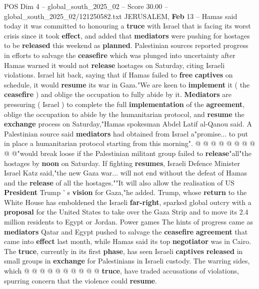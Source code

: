 \begin{textsample}{POS Dim 4 – global\_south\_2025\_02 – Score 30.00 – global\_south\_2025\_02/121250582.txt}  \label{ex:f4_pos_029}
JERUSALEM, \textbf{Feb} 13 -- Hamas said today it was committed to honouring a \textbf{truce} with Israel that is facing its worst crisis since it took \textbf{effect}, and added that \textbf{mediators} were pushing for hostages to be \textbf{released} this weekend as \textbf{planned}.
Palestinian sources reported progress in efforts to salvage the \textbf{ceasefire} which was plunged into uncertainty after Hamas warned it would not \textbf{release} hostages on Saturday, citing Israeli violations.
Israel hit back, saying that if Hamas failed to \textbf{free} \textbf{captives} on schedule, it would \textbf{resume} its war in Gaza."We are keen to \textbf{implement} it ( the \textbf{ceasefire} ) and oblige the occupation to fully abide by it. \textbf{Mediators} are pressuring ( Israel ) to complete the full \textbf{implementation} of the \textbf{agreement}, oblige the occupation to abide by the humanitarian protocol, and \textbf{resume} the \textbf{exchange} process on Saturday,"Hamas spokesman Abdel Latif al-Qanou said.
A Palestinian source said \textbf{mediators} had obtained from Israel a"promise... to put in place a humanitarian protocol starting from this morning". @ @ @ @ @ @ @ @ @ @"would break loose if the Palestinian militant group failed to \textbf{release}"all"the hostages by \textbf{noon} on Saturday.
If fighting \textbf{resumes}, Israeli Defence Minister Israel Katz said,"the new Gaza war... will not end without the defeat of Hamas and the \textbf{release} of all the hostages.""It will also allow the realisation of US \textbf{President} Trump ' s \textbf{vision} for Gaza,"he added.
Trump, whose \textbf{return} to the White House has emboldened the Israeli \textbf{far-right}, sparked global outcry with a \textbf{proposal} for the United States to take over the Gaza Strip and to move its 2.4 million residents to Egypt or Jordan.
Power games The hints of progress came as \textbf{mediators} Qatar and Egypt pushed to salvage the \textbf{ceasefire} \textbf{agreement} that came into \textbf{effect} last month, while Hamas said its top \textbf{negotiator} was in Cairo.
The \textbf{truce}, currently in its first \textbf{phase}, has seen Israeli \textbf{captives} \textbf{released} in small groups in \textbf{exchange} for Palestinians in Israeli custody.
The warring sides, which @ @ @ @ @ @ @ @ @ @ \textbf{truce}, have traded accusations of violations, spurring concern that the violence could \textbf{resume}.

\end{textsample}
